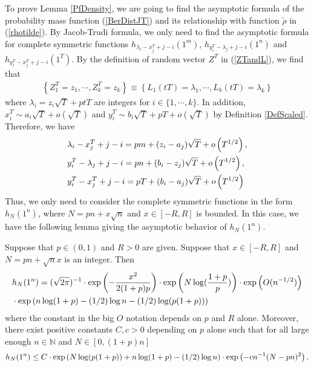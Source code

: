 To prove Lemma \ref{PfDensity}, we are going to find the asymptotic formula of the probability mass function (\ref{BerDistJT}) and its relationship with function $\widetilde{\rho}$ in (\ref{rhotilde}). By Jacob-Trudi formula, we only need to find the asymptotic formula for complete symmetric functions $h_{\lambda_{i}-x_{j}^{T}+j-i}(1^{m})$, $h_{y_{i}^{T}-\lambda_{j}+j-i}(1^{n})$ and $h_{y_{i}^{T}-x_{j}^{T}+j-i}(1^{T})$. By the definition of random vector $Z^{T}$ in (\ref{ZTandL}), we find that 
\begin{align}
	\left\{Z^{T}_{1}=z_1,\cdots, Z^{T}_{k}=z_k\right\}\equiv\left\{L_{1}(tT)=\lambda_1,\cdots,L_{k}(tT)=\lambda_k\right\}
\end{align}
where $\lambda_{i}=z_{i}\sqrt{T}+ptT$ are integers for $i\in\{1,\cdots,k\}$. In addition, $x_{i}^{T}\sim a_{i}\sqrt{T}+o\left(\sqrt{T}\right)$ and $y_{i}^{T}\sim b_{i}\sqrt{T}+pT+o\left(\sqrt{T}\right)$ by Definition \ref{DefScaled}. Therefore, we have
\begin{equation}{\label{3N}}
\begin{split}
	&\lambda_{i}-x_{j}^{T}+j-i=pm+(z_i-a_j)\sqrt{T}+o\left(T^{1/2}\right),\\ 
	& y_{i}^{T}-\lambda_{j}+j-i=pn+(b_{i}-z_{j})\sqrt{T}+o\left(T^{1/2}\right),\\
	& y_{i}^{T}-x_{j}^{T}+j-i=pT+(b_i-a_j)\sqrt{T}+o\left(T^{1/2}\right)
\end{split}
\end{equation}
Thus, we only need to consider the complete symmetric functions in the form $h_{N}(1^{n})$, where $N=pn+x\sqrt{n}$ and $x\in[-R,R]$ is bounded. In this case, we have the following lemma giving the asymptotic behavior of $h_{N}(1^{n})$.
\begin{lemma}{\label{Limh}}
	Suppose that $p\in(0,1)$ and $R>0$ are given. Suppose that $x\in[-R,R]$ and $N=pn+\sqrt{n}x$ is an integer. Then 
\begin{equation}
	\begin{split}{\label{AsympForh}}
&h_{N}(1^{n})=(\sqrt{2\pi})^{-1}\cdot \exp\left(-\frac{x^2}{2(1+p)p}\right)\cdot \exp\left(N\log(\frac{1+p}{p})\right)\cdot \exp\left(O(n^{-1/2})\right)\\
& \cdot\exp\left(n\log(1+p)-(1/2)\log n-(1/2)\log(p(1+p))\right)
\end{split}
\end{equation}
where the constant in the big $O$ notation depends on $p$ and $R$ alone. Moreover, there exist positive constants $C,c>0$ depending on $p$ alone such that for all large enough $n\in\mathbb{N}$ and $N\in[0,(1+p)n]$
\begin{equation}{\label{hbounded}}
	h_{N}(1^n)\leq C\cdot \exp\left(N\log(p(1+p))+n\log(1+p)-(1/2)\log n\right)\cdot \exp\left(-cn^{-1}(N-pn)^2\right).
\end{equation}
\end{lemma}
